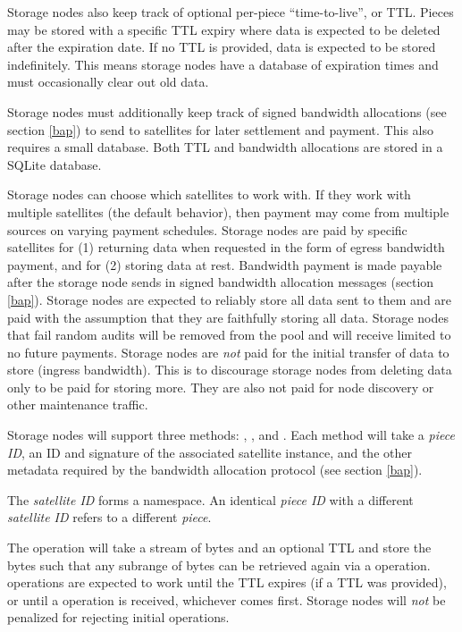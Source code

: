 \documentclass[11pt,fleqn,openany]{book}
\begin{document}
Storage nodes also keep track of optional per-piece ``time-to-live'', or TTL.
Pieces may be stored with a specific TTL expiry where data is expected to
be deleted after the expiration date. If no TTL is provided, data is expected
to be stored indefinitely. This means storage nodes have a database of
expiration
times and must occasionally clear out old data.

Storage nodes must additionally keep track of signed bandwidth allocations
(see section \ref{bap}) to send to
satellites for later settlement and payment. This also requires a small
database. Both TTL and bandwidth allocations are stored in a SQLite
\cite{sqlite} database.

Storage nodes can choose which satellites to work with. If they work
with multiple satellites (the default behavior), then payment may come from
multiple sources on varying payment schedules.
Storage nodes are paid by specific satellites for (1) returning data when
requested in
the form of egress bandwidth payment, and for (2) storing data at rest.
Bandwidth payment is made payable after
the storage node sends in signed bandwidth allocation messages
(section \ref{bap}).
Storage nodes are expected to reliably store all data sent to them and are
paid
with the assumption that they are faithfully storing all data.
Storage nodes that fail random audits will be removed from the pool and will
receive
limited to no future payments.
Storage nodes are {\em not} paid for the initial transfer of data to store
(ingress
bandwidth). This is to discourage storage nodes from deleting data only to be
paid for
storing more. They are also not paid for node discovery or other
maintenance traffic.

Storage nodes will support three methods: , , and
.
Each method will take a {\em piece ID}, an ID and signature of the associated
satellite instance, and the other metadata required by the
bandwidth allocation protocol (see section \ref{bap}).

The {\em satellite ID} forms a namespace. An identical {\em piece ID} with a
different {\em satellite ID} refers to a different {\em piece}.

The  operation will take a stream of bytes and an optional TTL and
store the bytes such
that any subrange of bytes can be retrieved again via a  operation.
 operations are expected to work until the TTL expires (if a TTL was
provided), or until a  operation is received, whichever comes
first.
Storage
nodes will {\em not} be penalized for rejecting initial  operations.
\end{document}
